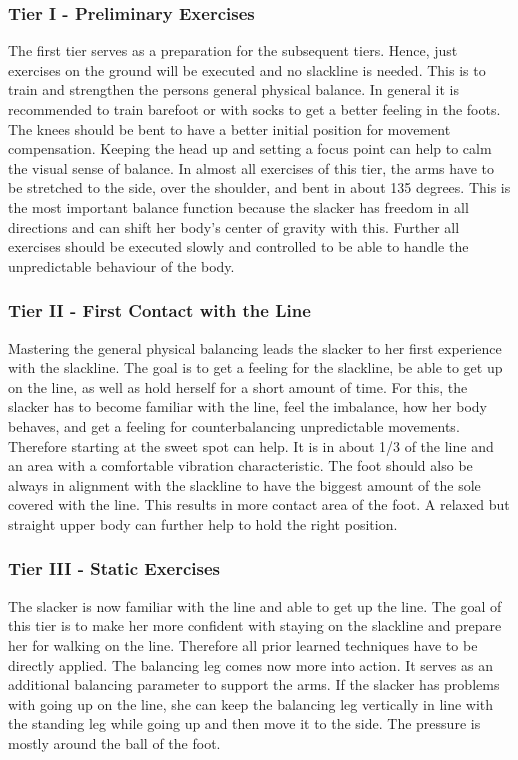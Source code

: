 \subsubsection{Tier I - Preliminary Exercises}
The first tier serves as a preparation for the subsequent tiers. Hence, just exercises on the ground will be executed and no slackline is needed. This is to train and strengthen the persons general physical balance. In general it is recommended to train barefoot or with socks to get a better feeling in the foots. The knees should be bent to have a better initial position for movement compensation. Keeping the head up and setting a focus point can help to calm the visual sense of balance. In almost all exercises of this tier, the arms have to be stretched to the side, over the shoulder, and bent in about 135 degrees. This is the most important balance function because the slacker has freedom in all directions and can shift her body's center of gravity with this. Further all exercises should be executed slowly and controlled to be able to handle the unpredictable behaviour of the body.

\subsubsection{Tier II - First Contact with the Line}
Mastering the general physical balancing leads the slacker to her first experience with the slackline. The goal is to get a feeling for the slackline, be able to get up on the line, as well as hold herself for a short amount of time. For this, the slacker has to become familiar with the line, feel the imbalance, how her body behaves, and get a feeling for counterbalancing unpredictable movements. Therefore starting at the sweet spot can help. It is in about 1/3 of the line and an area with a comfortable vibration characteristic. The foot should also be always in alignment with the slackline to have the biggest amount of the sole covered with the line. This results in more contact area of the foot. A relaxed but straight upper body can further help to hold the right position.

\subsubsection{Tier III - Static Exercises}
The slacker is now familiar with the line and able to get up the line. The goal of this tier is to make her more confident with staying on the slackline and prepare her for walking on the line. Therefore all prior learned techniques have to be directly applied. The balancing leg comes now more into action. It serves as an additional balancing parameter to support the arms. If the slacker has problems with going up on the line, she can keep the balancing leg vertically in line with the standing leg while going up and then move it to the side. The pressure is mostly around the ball of the foot.


